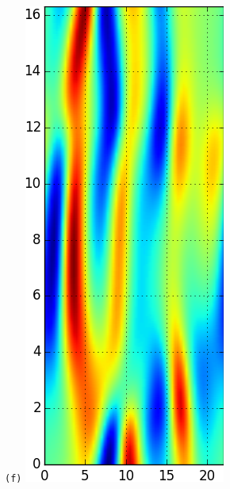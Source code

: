 \documentclass[final,leqno,onefignum,onetabnum]{siamltexmm}
\begin{document}
\begin{figure}[h]
\begin{minipage}{.115\textwidth}
  \end{minipage}
  \begin{minipage}{.115\textwidth}
    \centering \small{\texttt{(f)}}
    \includegraphics[width=\textwidth]{rpo1Fv4_64}

\end{minipage}
\end{figure}
\end{document}
